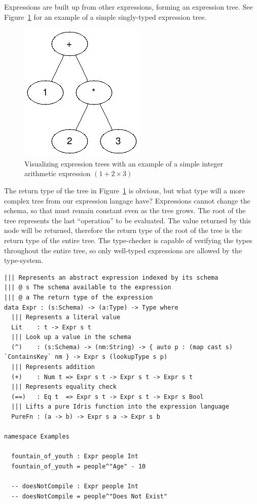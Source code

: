 \documentclass[12pt]{report}
\begin{document}
Expressions are built up from other expressions, forming an expression tree.
See Figure~\ref{fig:expr_tree} for an example of a simple singly-typed expression tree.

\begin{figure}[h!]
    \centering
    \includegraphics[width=0.25\linewidth]{assets/expr_tree.png}
    \caption{Visualizing expression trees with an example of a simple integer arithmetic expression $(1 + 2 \times 3)$}
    \label{fig:expr_tree}
\end{figure}


The return type of the tree in Figure~\ref{fig:expr_tree} is obvious, but what type will a more complex tree from our expression langage have?
Expressions cannot change the schema, so that must remain constant even as the tree grows.
The root of the tree represents the last ``operation'' to be evaluated.
The value returned by this node will be returned, therefore the return type of the root of the tree is the return type of the entire tree.
The type-checker is capable of verifying the types throughout the entire tree, so only well-typed expressions are allowed by the type-system.

\begin{lstlisting}[caption={Representing expressions},label={lst:expressions}]
||| Represents an abstract expression indexed by its schema
||| @ s The schema available to the expression
||| @ a The return type of the expression
data Expr : (s:Schema) -> (a:Type) -> Type where
  ||| Represents a literal value
  Lit    : t -> Expr s t
  ||| Look up a value in the schema
  (^)    : (s:Schema) -> (nm:String) -> { auto p : (map cast s) `ContainsKey` nm } -> Expr s (lookupType s p)
  ||| Represents addition
  (+)    : Num t => Expr s t -> Expr s t -> Expr s t
  ||| Represents equality check
  (==)   : Eq t  => Expr s t -> Expr s t -> Expr s Bool
  ||| Lifts a pure Idris function into the expression language
  PureFn : (a -> b) -> Expr s a -> Expr s b

namespace Examples

  fountain_of_youth : Expr people Int
  fountain_of_youth = people^"Age" - 10

  -- doesNotCompile : Expr people Int
  -- doesNotCompile = people^"Does Not Exist"
\end{lstlisting}
\end{document}
